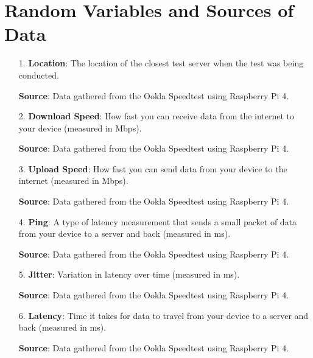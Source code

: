 \documentclass[conference]{IEEEtran}
\begin{document}
\section{Random Variables and Sources of Data}
\begin{enumerate}
    \item[1.]
    \textbf{Location}:
    The location of the closest test server when the test was being conducted.

    \textbf{Source}: Data gathered from the Ookla Speedtest using Raspberry Pi 4. 
    \item[2.]    
    \textbf{Download Speed}: 
    How fast you can receive data from the internet to your device (measured in Mbps).

    \textbf{Source}: Data gathered from the Ookla Speedtest using Raspberry Pi 4. 
    \item[3.]
    \textbf{Upload Speed}:
    How fast you can send data from your device to the internet (measured in Mbps). 
    
    \textbf{Source}: Data gathered from the Ookla Speedtest using Raspberry Pi 4. 
    \item[4.]
    \textbf{Ping}: 
    A type of latency measurement that sends a small packet of data from your device to a server and back (measured in ms).

    \textbf{Source}: Data gathered from the Ookla Speedtest using Raspberry Pi 4. 
    \item[5.] 
    \textbf{Jitter}: 
    Variation in latency over time (measured in ms).

    \textbf{Source}: Data gathered from the Ookla Speedtest using Raspberry Pi 4. 
    \item[6.] 
    \textbf{Latency}: 
    Time it takes for data to travel from your device to a server and back (measured in ms).

    \textbf{Source}: Data gathered from the Ookla Speedtest using Raspberry Pi 4. 
\end{enumerate}
\end{document}
